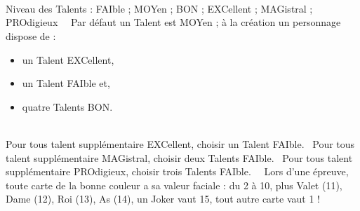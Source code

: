 \documentclass[a5paper,french]{article}
\begin{document}
\clearpage

\hfill~\\ \dotfill~\\ \hfill~\\

\begin{minipage}[ht]{0.95\textwidth}
	Niveau des Talents : FAIble ; MOYen ; BON ; EXCellent ; MAGistral ; PROdigieux~\newline~\newline
	Par défaut un Talent est MOYen ; à la création un personnage dispose de : 
	\begin{itemize}
		\item un Talent EXCellent, 
		\item un Talent FAIble et, 
		\item quatre Talents BON. 
	\end{itemize}~\\
	Pour tous talent supplémentaire EXCellent, choisir un Talent FAIble.~\newline
	Pour tous talent supplémentaire MAGistral, choisir deux Talents FAIble.~\newline
	Pour tous talent supplémentaire PROdigieux, choisir trois Talents FAIble.~\newline~\newline
	Lors d'une épreuve, toute carte de la bonne couleur a sa valeur faciale : du 2 à 10, plus Valet (11), Dame (12), Roi (13), As (14), un Joker vaut 15, tout autre carte vaut 1 !
\end{minipage}~\\~\\

\end{document}
